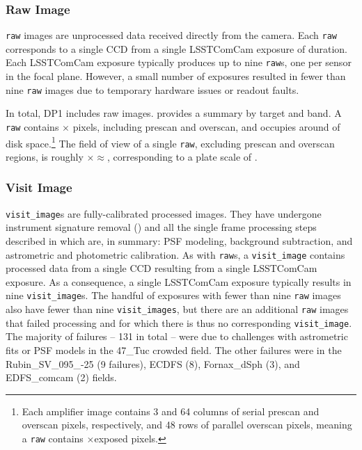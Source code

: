 \subsubsection{Raw Image}
\texttt{raw} images \citep{10.71929/rubin/2570310} are unprocessed data received directly from the camera.
Each \texttt{raw} corresponds to a single \gls{CCD} from a single \gls{LSSTComCam} exposure of \exposuretime duration.
Each \gls{LSSTComCam} exposure typically produces up to nine \texttt{raw}s, one per sensor in the focal plane.
However, a small number of exposures resulted in fewer than nine \texttt{raw} images due to temporary hardware issues or readout faults.

In total, \gls{DP1} includes \nraws raw images.
 provides a summary by target and band.
A \texttt{raw} contains \nrawpixx $\times$ \nrawpixy pixels, including prescan and overscan, and occupies around \rawhdd of disk space.\footnote{Each amplifier image contains 3 and 64 columns of serial prescan and overscan pixels, respectively, and 48 rows of parallel overscan pixels, meaning a \texttt{raw} contains \nvisitimagepixx$\times$\nvisitimagepixy exposed pixels.}
The field of view of a single \texttt{raw}, excluding prescan and overscan regions, is roughly \visitimagefovx$\times$\visitimagefovy$\approx$\visitimagefov, corresponding to a plate scale of \rawplatescale.


\subsubsection{Visit Image}
\texttt{visit\_image}s \citep{10.71929/rubin/2570311} are fully-calibrated processed images.
They have undergone instrument signature removal () and all the single frame processing steps described in  which are, in summary: \gls{PSF} modeling, \gls{background} subtraction, and astrometric and photometric \gls{calibration}.
As with \texttt{raw}s, a \texttt{visit\_image} contains processed data from a single \gls{CCD} resulting from a single \exposuretime \gls{LSSTComCam} exposure.
As a consequence, a single \gls{LSSTComCam} exposure typically results in nine \texttt{visit\_image}s.
The handful of exposures with fewer than nine \texttt{raw} images also have fewer than nine \texttt{visit\_images}, but there are an additional \nsfpfails \texttt{raw} images that failed processing and for which there is thus no corresponding \texttt{visit\_image}.
The majority of failures -- 131 in total -- were due to challenges with astrometric fits or \gls{PSF} models in the 47\_Tuc crowded field. The other failures were in the Rubin\_SV\_095\_-25 (9 failures), ECDFS (8), Fornax\_dSph (3), and EDFS\_comcam (2) fields.

